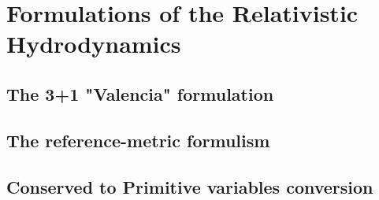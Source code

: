 
\chapter{Formulations of the Relativistic Hydrodynamics}  %

\ifpdf
    \graphicspath{{Chapter3/Figs/Raster/}{Chapter3/Figs/PDF/}{Chapter3/Figs/}}
\else
    \graphicspath{{Chapter3/Figs/Vector/}{Chapter3/Figs/}}
\fi


\section{The 3+1 "Valencia" formulation} %
\label{section3.1}

\section{The reference-metric formulism} %
\label{section3.2}

\section{Conserved to Primitive variables conversion}  %
\label{section3.3}


